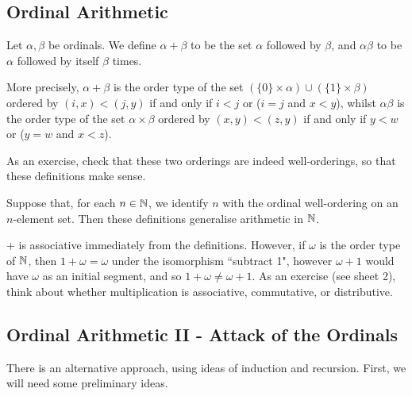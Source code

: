 \documentclass[10pt,a4paper]{article}
\begin{document}
\subsection{Ordinal Arithmetic}
Let $\alpha, \beta$ be ordinals. We define $\alpha+\beta$ to be the set $\alpha$ followed by $\beta$, and $\alpha\beta$ to be $\alpha$ followed by itself $\beta$ times.

More precisely, $\alpha+\beta$ is the order type of the set $(\{0\}\times \alpha)\cup (\{1\}\times \beta)$ ordered by $(i,x) < (j,y)$ if and only if $i<j$ or ($i=j$ and $x<y$), whilst $\alpha\beta$ is the order type of the set $\alpha \times \beta$ ordered by $(x,y)<(z,y)$ if and only if $y<w$ or ($y=w$ and $x<z$).

As an exercise, check that these two orderings are indeed well-orderings, so that these definitions make sense.

Suppose that, for each $n \in \mathbb{N}$, we identify $n$ with the ordinal well-ordering on an $n$-element set. Then these definitions generalise arithmetic in $\mathbb{N}$. 
\begin{figure}[H]
\centering
{}
\end{figure}

+ is associative immediately from the definitions. However, if $\omega$ is the order type of $\mathbb{N}$, then $1+\omega = \omega$ under the isomorphism ``subtract 1", however $\omega+1$ would have $\omega$ as an initial segment, and so $1+\omega \neq \omega+1$. As an exercise (see sheet 2), think about whether multiplication is associative, commutative, or distributive.

\subsection{Ordinal Arithmetic II - Attack of the Ordinals}
There is an alternative approach, using ideas of induction and recursion. First, we will need some preliminary ideas.
\end{document}
